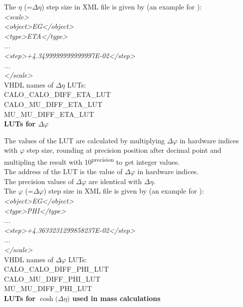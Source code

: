 The $\eta$ (=$\Delta\eta$) step size in XML file is given by (an example for \eg):\\
\textit{<scale>\\
<object>EG</object>\\
    <type>ETA</type>\\
    ...\\
    <step>+4.3499999999999997E-02</step>\\
...\\
</scale>}\\

VHDL names of $\Delta\eta$ LUTs:\\
CALO\_CALO\_DIFF\_ETA\_LUT\\
CALO\_MU\_DIFF\_ETA\_LUT\\
MU\_MU\_DIFF\_ETA\_LUT\\

\textbf{LUTs for $\Delta\varphi$}
\label{sec:gtl:calc_luts_delta_phi}

The values of the LUT are calculated by multiplying $\Delta\varphi$ in hardware indices with $\varphi$ step size, rounding at precision position after decimal point and multipling the result with 10\textsuperscript{\tiny{precision}} to get integer values.\\
The address of the LUT is the value of $\Delta\varphi$ in hardware indices.\\

The precision values of $\Delta\varphi$ are identical with $\Delta\eta$.\\

The $\varphi$ (=$\Delta\varphi$) step size in XML file is given by (an example for \eg):\\
\textit{<object>EG</object>\\
    <type>PHI</type>\\
    ...\\
    <step>+4.3633231299858237E-02</step>\\
...\\
</scale>}\\

VHDL names of $\Delta\varphi$ LUTs:\\
CALO\_CALO\_DIFF\_PHI\_LUT\\
CALO\_MU\_DIFF\_PHI\_LUT\\
MU\_MU\_DIFF\_PHI\_LUT\\

\textbf{LUTs for $\cosh($$\Delta\eta$$)$ used in mass calculations}
\label{sec:gtl:calc_luts_cosh_delta_eta}

